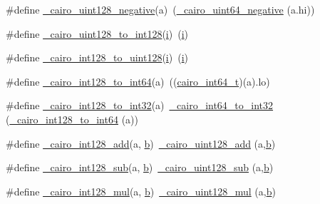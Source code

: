 \begin{DoxyCompactItemize}
\item 
\#define \hyperlink{cairo-wideint-private_8h_a354a082eb324075c59c65cc571ef18f2}{\+\_\+cairo\+\_\+uint128\+\_\+negative}(a)~(\hyperlink{cairo-wideint-private_8h_ae93c78397b1830f413141df1f4f1abbf}{\+\_\+cairo\+\_\+uint64\+\_\+negative} (a.\+hi))
\item 
\#define \hyperlink{cairo-wideint-private_8h_a04d6d0c384e4d19fc8794e030c9af278}{\+\_\+cairo\+\_\+uint128\+\_\+to\+\_\+int128}(\hyperlink{lte__uplink__power__control_8m_a6f6ccfcf58b31cb6412107d9d5281426}{i})~(\hyperlink{lte__uplink__power__control_8m_a6f6ccfcf58b31cb6412107d9d5281426}{i})
\item 
\#define \hyperlink{cairo-wideint-private_8h_a5225ab944759b13e769c7e9edecfc6aa}{\+\_\+cairo\+\_\+int128\+\_\+to\+\_\+uint128}(\hyperlink{lte__uplink__power__control_8m_a6f6ccfcf58b31cb6412107d9d5281426}{i})~(\hyperlink{lte__uplink__power__control_8m_a6f6ccfcf58b31cb6412107d9d5281426}{i})
\item 
\#define \hyperlink{cairo-wideint-private_8h_ae0edc4ae6c8bb53e7db1836c46d605ff}{\+\_\+cairo\+\_\+int128\+\_\+to\+\_\+int64}(a)~((\hyperlink{cairo-wideint-private_8h_a31b93307f43703e28eef43fad0166834}{cairo\+\_\+int64\+\_\+t})(a).lo)
\item 
\#define \hyperlink{cairo-wideint-private_8h_a3b2720ef1aad922b2df54326b7b57546}{\+\_\+cairo\+\_\+int128\+\_\+to\+\_\+int32}(a)~\hyperlink{cairo-wideint-private_8h_aaa6625ebb4c856559ee2dcf9d2b0358c}{\+\_\+cairo\+\_\+int64\+\_\+to\+\_\+int32} (\hyperlink{cairo-wideint-private_8h_ae0edc4ae6c8bb53e7db1836c46d605ff}{\+\_\+cairo\+\_\+int128\+\_\+to\+\_\+int64} (a))
\item 
\#define \hyperlink{cairo-wideint-private_8h_a7578d3bff48f16f4f8d00c9945aec402}{\+\_\+cairo\+\_\+int128\+\_\+add}(a,  \hyperlink{lte__pathloss_8m_a21ad0bd836b90d08f4cf640b4c298e7c}{b})~\hyperlink{cairo-wideint_8c_ac5ea95d722e772cbae83ad6659a629fe}{\+\_\+cairo\+\_\+uint128\+\_\+add} (a,\hyperlink{lte__pathloss_8m_a21ad0bd836b90d08f4cf640b4c298e7c}{b})
\item 
\#define \hyperlink{cairo-wideint-private_8h_ad11354525d9b2e5d45e38c9c46dc039d}{\+\_\+cairo\+\_\+int128\+\_\+sub}(a,  \hyperlink{lte__pathloss_8m_a21ad0bd836b90d08f4cf640b4c298e7c}{b})~\hyperlink{cairo-wideint_8c_a4ac7f020e382247e3693fb1597e41fdf}{\+\_\+cairo\+\_\+uint128\+\_\+sub} (a,\hyperlink{lte__pathloss_8m_a21ad0bd836b90d08f4cf640b4c298e7c}{b})
\item 
\#define \hyperlink{cairo-wideint-private_8h_af017b93a9537232cc6f1940ca887f9c5}{\+\_\+cairo\+\_\+int128\+\_\+mul}(a,  \hyperlink{lte__pathloss_8m_a21ad0bd836b90d08f4cf640b4c298e7c}{b})~\hyperlink{cairo-wideint_8c_af8bc146554c0f9732258ccbd7457a0a1}{\+\_\+cairo\+\_\+uint128\+\_\+mul} (a,\hyperlink{lte__pathloss_8m_a21ad0bd836b90d08f4cf640b4c298e7c}{b})

\end{DoxyCompactItemize}
